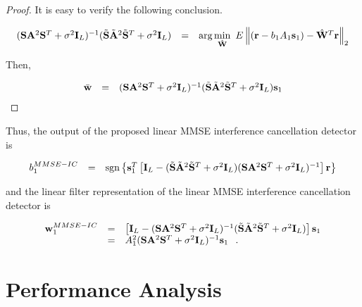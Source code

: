 \documentclass[a4paper,12pt,fleqn]{article}
\newcommand{\br}{{\mathbf r}}
\newcommand{\bA}{{\mathbf A}}
\newcommand{\bs}{{\bf s}}
\newcommand{\bw}{{\bf w}}
\newcommand{\bS}{{\bf S}}
\newcommand{\bI}{{\bf I}}
\newcommand{\bW}{{\bf W}}
\begin{document}
\begin{proof}

It is easy to verify the following conclusion.

\begin{equation}
\begin{array}{rcl}
(\bS\bA^2\bS^T+\sigma^2\bI_L)^{-1}(\tilde{\bS}\tilde{\bA}^2\tilde{\bS}^T+\sigma^2\bI_L)&=&\mbox{arg}\min\limits_{\hat\bW}\
E\left\|(\br-b_1A_1\bs_1)-\hat\bW^T\br\right\|_2
\end{array}
\end{equation}

\noindent Then,

\begin{equation}
\begin{array}{rcl}
\bar\bw&=&(\bS\bA^2\bS^T+\sigma^2\bI_L)^{-1}(\tilde{\bS}\tilde{\bA}^2\tilde{\bS}^T+\sigma^2\bI_L)\bs_1
\end{array}
\end{equation}

\end{proof}

Thus, the output of the proposed linear MMSE interference
cancellation detector is

\begin{equation}
\begin{array}{rcl}
b_1^{MMSE-IC}&=&\mbox{sgn}\left\{\bs_1^T
\left[\bI_L-(\tilde{\bS}\tilde{\bA}^2\tilde{\bS}^T+\sigma^2\bI_L)(\bS\bA^2\bS^T+\sigma^2\bI_L)^{-1}\right]\br\right\}
\end{array}
\end{equation}

\noindent and the linear filter representation of the linear MMSE
interference cancellation detector is

\begin{equation}
\begin{array}{rcl}
\bw_1^{MMSE-IC}&=&\left[\bI_L-(\bS\bA^2\bS^T+\sigma^2\bI_L)^{-1}(\tilde{\bS}\tilde{\bA}^2\tilde{\bS}^T+\sigma^2\bI_L)\right]\bs_1\\
&=&A_1^2(\bS\bA^2\bS^T+\sigma^2\bI_L)^{-1}\bs_1 \hspace{0.1in}.
\end{array}\label{w_MMSEIC}
\end{equation}


\section{Performance Analysis}
\end{document}
